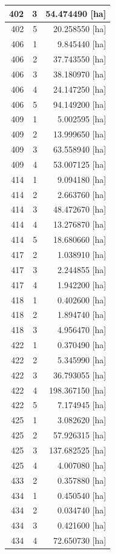\documentclass[11pt,]{book}
\begin{document}
\begin{table}
\begin{tabular}[t]{r|r|r}
\hline
402 & 3 & 54.474490 [ha]\\
\hline
402 & 5 & 20.258550 [ha]\\
\hline
406 & 1 & 9.845440 [ha]\\
\hline
406 & 2 & 37.743550 [ha]\\
\hline
406 & 3 & 38.180970 [ha]\\
\hline
406 & 4 & 24.147250 [ha]\\
\hline
406 & 5 & 94.149200 [ha]\\
\hline
409 & 1 & 5.002595 [ha]\\
\hline
409 & 2 & 13.999650 [ha]\\
\hline
409 & 3 & 63.558940 [ha]\\
\hline
409 & 4 & 53.007125 [ha]\\
\hline
414 & 1 & 9.094180 [ha]\\
\hline
414 & 2 & 2.663760 [ha]\\
\hline
414 & 3 & 48.472670 [ha]\\
\hline
414 & 4 & 13.276870 [ha]\\
\hline
414 & 5 & 18.680660 [ha]\\
\hline
417 & 2 & 1.038910 [ha]\\
\hline
417 & 3 & 2.244855 [ha]\\
\hline
417 & 4 & 1.942200 [ha]\\
\hline
418 & 1 & 0.402600 [ha]\\
\hline
418 & 2 & 1.894740 [ha]\\
\hline
418 & 3 & 4.956470 [ha]\\
\hline
422 & 1 & 0.370490 [ha]\\
\hline
422 & 2 & 5.345990 [ha]\\
\hline
422 & 3 & 36.793055 [ha]\\
\hline
422 & 4 & 198.367150 [ha]\\
\hline
422 & 5 & 7.174945 [ha]\\
\hline
425 & 1 & 3.082620 [ha]\\
\hline
425 & 2 & 57.926315 [ha]\\
\hline
425 & 3 & 137.682525 [ha]\\
\hline
425 & 4 & 4.007080 [ha]\\
\hline
433 & 2 & 0.357880 [ha]\\
\hline
434 & 1 & 0.450540 [ha]\\
\hline
434 & 2 & 0.034740 [ha]\\
\hline
434 & 3 & 0.421600 [ha]\\
\hline
434 & 4 & 72.650730 [ha]\\

\end{tabular}
\end{table}
\end{document}
